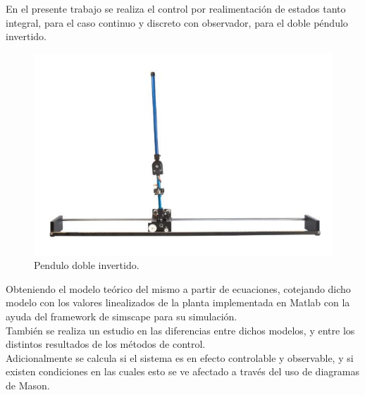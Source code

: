 %
%
%
En el presente trabajo se realiza el control por realimentación de estados tanto integral, para el caso continuo y discreto con observador, para el doble péndulo invertido. 

\begin{figure}[H]
	\centering
	\includegraphics[width=\linewidth]{ImagenesResumen/base}
	\caption{Pendulo doble invertido.}	
	\label{fig:pend}
\end{figure}
Obteniendo el modelo teórico del mismo a partir de ecuaciones, cotejando dicho modelo con los valores linealizados de la planta implementada en Matlab con la ayuda del framework de simscape para su simulación.\\
También se realiza un estudio en las diferencias entre dichos modelos, y entre los distintos resultados de los métodos de control.
\\
Adicionalmente se calcula si el sistema es en efecto controlable y observable, y si existen condiciones en las cuales esto se ve afectado a través del uso de diagramas de Mason.

%